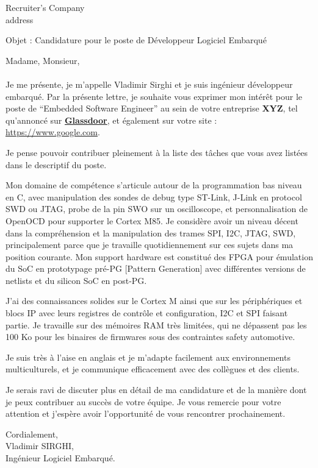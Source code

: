 \documentclass[a4paper,12pt]{letter}
\date{\today} %
\begin{document}
\begin{letter}{Recruiter's Company \\ address \\ } %

\opening{Objet : Candidature pour le poste de Développeur Logiciel Embarqué}
Madame, Monsieur,\\\\
Je me présente, je m’appelle Vladimir Sirghi et je suis ingénieur développeur embarqué.
Par la présente lettre, je souhaite vous exprimer mon intérêt pour le poste de “Embedded Software Engineer” au sein de votre entreprise \textbf{XYZ}, tel qu'annoncé sur \href{https://www.glassdoor.fr/}{\textbf{Glassdoor}}, et également sur votre site : \url{https://www.google.com}.

Je pense pouvoir contribuer pleinement à la liste des tâches que vous avez listées dans le descriptif du poste.

Mon domaine de compétence s’articule autour de la programmation bas niveau en C, avec manipulation des sondes de debug type ST-Link, J-Link en protocol SWD ou JTAG, probe de la pin SWO sur un oscilloscope, et personnalisation de OpenOCD pour supporter le Cortex M85. Je considère avoir un niveau décent dans la compréhension et la manipulation des trames SPI, I2C, JTAG, SWD, principalement parce que je travaille quotidiennement sur ces sujets dans ma position courante. Mon support hardware est constitué des FPGA pour émulation du SoC en prototypage pré-PG [Pattern Generation] avec différentes versions de netlists et du silicon SoC en post-PG.

J’ai des connaissances solides sur le Cortex M ainsi que sur les périphériques et blocs IP avec leurs registres de contrôle et configuration, I2C et SPI faisant partie. Je travaille sur des mémoires RAM très limitées, qui ne dépassent pas les 100 Ko pour les binaires de firmwares sous des contraintes safety automotive.

Je suis très à l’aise en anglais et je m'adapte facilement aux environnements multiculturels, et je communique efficacement avec des collègues et des clients.

Je serais ravi de discuter plus en détail de ma candidature et de la manière dont je peux contribuer au succès de votre équipe. Je vous remercie pour votre attention et j'espère avoir l'opportunité de vous rencontrer prochainement.

\begin{flushleft}
Cordialement, \\
Vladimir SIRGHI, \\
Ingénieur Logiciel Embarqué.
\end{flushleft}

\end{letter}
\end{document}
